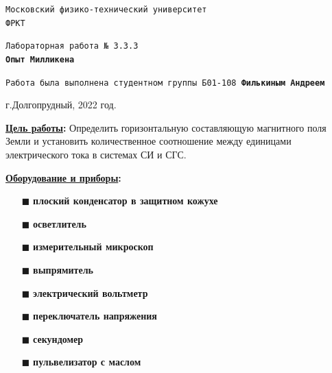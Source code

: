\documentclass[a4paper,12pt]{article} %
\begin{document}
	
	
	\begin{titlepage}
		\begin{center}
			\large \texttt{Московский физико-технический университет} \\
			\large \texttt{ФРКТ} \\
			\vspace{0.2cm}
			
			\vspace{4.5cm}
			\LARGE {\texttt{Лабораторная работа № 3.3.3}} \\ \vspace{0.2cm}
			\LARGE \textbf{\texttt{Опыт Милликена}}
		\end{center}
		\vspace{2.3cm} \large
		
		\begin{center}
			\texttt{Работа была выполнена студентном группы Б01-108 \textbf{Филькиным Андреем}}
		\end{center}
		\begin{center} \vspace{50mm}
			г.Долгопрудный, 2022 год.\\
		\end{center}
	\end{titlepage}
	\newpage
	
	\textbf{\underline{Цель работы}:} Определить горизонтальную составляющую магнитного поля Земли и установить количественное соотношение между единицами электрического тока в системах СИ и СГС.
	
	\textbf{\underline{Оборудование и приборы}:} 
	\begin{center}
		\begin{enumerate}
			\item[$\blacksquare$] \textbf{плоский конденсатор в защитном кожухе}
			\item[$\blacksquare$] \textbf{осветлитель}
			\item[$\blacksquare$] \textbf{измерительный микроскоп}
			\item[$\blacksquare$] \textbf{выпрямитель}
			\item[$\blacksquare$] \textbf{электрический вольтметр}
			\item[$\blacksquare$] \textbf{переключатель напряжения}
			\item[$\blacksquare$] \textbf{секундомер}
			\item[$\blacksquare$] \textbf{пульвелизатор с маслом}
		\end{enumerate}
	\end{center}
\end{document}
